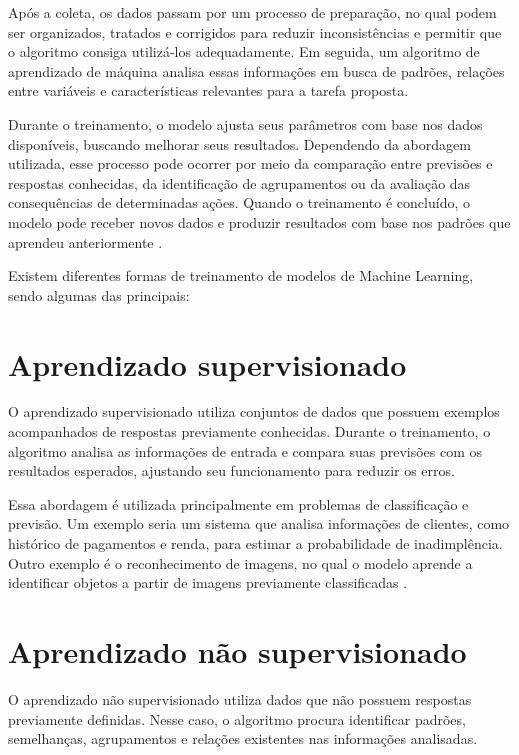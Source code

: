 Após a coleta, os dados passam por um processo de preparação, no qual podem ser organizados, tratados e corrigidos para reduzir inconsistências e permitir que o algoritmo consiga utilizá-los adequadamente. Em seguida, um algoritmo de aprendizado de máquina analisa essas informações em busca de padrões, relações entre variáveis e características relevantes para a tarefa proposta.

Durante o treinamento, o modelo ajusta seus parâmetros com base nos dados disponíveis, buscando melhorar seus resultados. Dependendo da abordagem utilizada, esse processo pode ocorrer por meio da comparação entre previsões e respostas conhecidas, da identificação de agrupamentos ou da avaliação das consequências de determinadas ações. Quando o treinamento é concluído, o modelo pode receber novos dados e produzir resultados com base nos padrões que aprendeu anteriormente \cite{ibmML, awsML}.

Existem diferentes formas de treinamento de modelos de Machine Learning, sendo algumas das principais:

\section{Aprendizado supervisionado}

O aprendizado supervisionado utiliza conjuntos de dados que possuem exemplos acompanhados de respostas previamente conhecidas. Durante o treinamento, o algoritmo analisa as informações de entrada e compara suas previsões com os resultados esperados, ajustando seu funcionamento para reduzir os erros.

Essa abordagem é utilizada principalmente em problemas de classificação e previsão. Um exemplo seria um sistema que analisa informações de clientes, como histórico de pagamentos e renda, para estimar a probabilidade de inadimplência. Outro exemplo é o reconhecimento de imagens, no qual o modelo aprende a identificar objetos a partir de imagens previamente classificadas \cite{googleSupervised, ibmML}.

\section{Aprendizado não supervisionado}

O aprendizado não supervisionado utiliza dados que não possuem respostas previamente definidas. Nesse caso, o algoritmo procura identificar padrões, semelhanças, agrupamentos e relações existentes nas informações analisadas.

